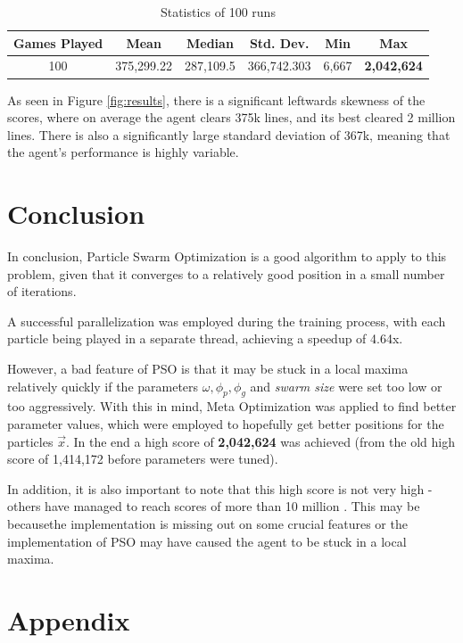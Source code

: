 \documentclass[12pt]{article}
\numberwithin{table}{section}
\numberwithin{figure}{section}
\begin{document}
\begin{table}[H]
\small
\centering
\caption{Statistics of 100 runs}
  \label{tab:results}
\begin{tabular}{|c|c|c|c|c|c|}
\hline
{\textbf{Games Played}} & {\textbf{Mean}} & {\textbf{Median}} & {\textbf{Std. Dev.}} & {\textbf{Min}} & {\textbf{Max}} 	\\ \hline
100 & 375,299.22 & 287,109.5 & 366,742.303 & 6,667 & \textbf{2,042,624}		\\ \hline
\end{tabular}
\end{table}


As seen in Figure \ref{fig:results}, there is a significant leftwards skewness of the scores, where on average the agent clears 375k lines, and its best cleared 2 million lines. There is also a significantly large standard deviation of 367k, meaning that the agent's performance is highly variable.

\section{Conclusion}
In conclusion, Particle Swarm Optimization is a good algorithm to apply to this problem, given that it converges to a relatively good position in a small number of iterations. 

A successful parallelization was employed during the training process, with each particle being played in a separate thread, achieving a speedup of 4.64x.

However, a bad feature of PSO is that it may be stuck in a local maxima relatively quickly if the parameters $\omega, \phi_p, \phi_g$ and \emph{swarm size} were set too low or too aggressively. With this in mind, Meta Optimization was applied to find better parameter values, which were employed to hopefully get better positions for the particles $\vec{x}$.  In the end a high score of \textbf{2,042,624} was achieved (from the old high score of 1,414,172 before parameters were tuned).

In addition, it is also important to note that this high score is not very high - others have managed to reach scores of more than 10 million \cite{ThieryImprovementsCROSS-ENTROPY}. This may be becausethe implementation is missing out on some crucial features or the implementation of PSO may have caused the agent to be stuck in a local maxima.
 
\newpage
\appendix
\section{Appendix}
\end{document}
